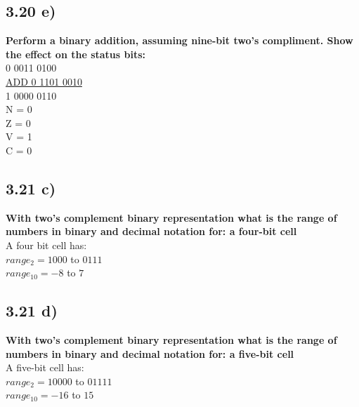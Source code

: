 \documentclass[a4paper,man,natbib]{apa6}
\begin{document}
	\subsection{3.20 e)}
	\textbf{Perform a binary addition, assuming nine-bit two's compliment. Show the effect on the status bits:} \\
	0 0011 0100 \\
	\noindent\underline{ADD 0 1101 0010} \\
	1 0000 0110 \\
	N = 0 \\
	Z = 0 \\
	V = 1 \\
	C = 0
	\subsection{3.21 c)}
	\textbf{With two's complement binary representation what is the range of numbers in binary and decimal notation for: a four-bit cell} \\
	A four bit cell has: \\
	$range_{2} = 1000$ to $0111$ \\
	$range_{10} = -8$ to $7$
	\subsection{3.21 d)}
	\textbf{With two's complement binary representation what is the range of numbers in binary and decimal notation for: a five-bit cell} \\
	A five-bit cell has: \\
	$range_{2} = 1 0000$ to $0 1111$ \\
	$range_{10} = -16$ to $15$ 
	
	\newpage
	\nocite{warford10}
	
	
\end{document}
